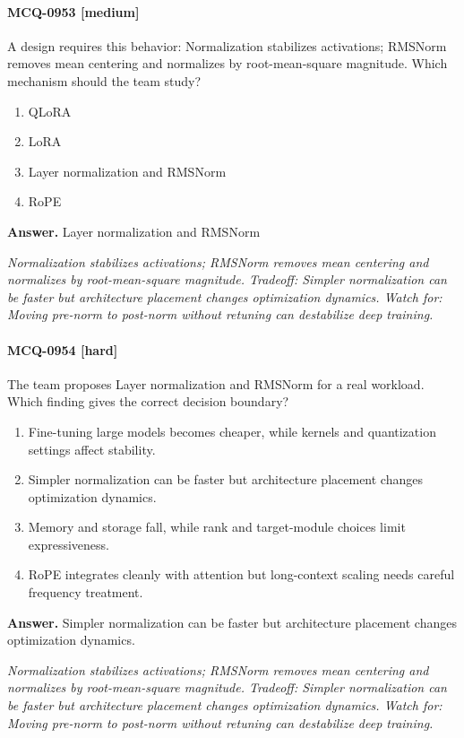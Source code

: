 \paragraph{MCQ-0953 [medium]} A design requires this behavior: Normalization stabilizes activations; RMSNorm removes mean centering and normalizes by root-mean-square magnitude. Which mechanism should the team study?
\begin{enumerate}[label=\Alph*.]
\item QLoRA
\item LoRA
\item Layer normalization and RMSNorm
\item RoPE
\end{enumerate}
\noindent\textbf{Answer.} Layer normalization and RMSNorm
\par\textit{Normalization stabilizes activations; RMSNorm removes mean centering and normalizes by root-mean-square magnitude. Tradeoff: Simpler normalization can be faster but architecture placement changes optimization dynamics. Watch for: Moving pre-norm to post-norm without retuning can destabilize deep training.}
\paragraph{MCQ-0954 [hard]} The team proposes Layer normalization and RMSNorm for a real workload. Which finding gives the correct decision boundary?
\begin{enumerate}[label=\Alph*.]
\item Fine-tuning large models becomes cheaper, while kernels and quantization settings affect stability.
\item Simpler normalization can be faster but architecture placement changes optimization dynamics.
\item Memory and storage fall, while rank and target-module choices limit expressiveness.
\item RoPE integrates cleanly with attention but long-context scaling needs careful frequency treatment.
\end{enumerate}
\noindent\textbf{Answer.} Simpler normalization can be faster but architecture placement changes optimization dynamics.
\par\textit{Normalization stabilizes activations; RMSNorm removes mean centering and normalizes by root-mean-square magnitude. Tradeoff: Simpler normalization can be faster but architecture placement changes optimization dynamics. Watch for: Moving pre-norm to post-norm without retuning can destabilize deep training.}
